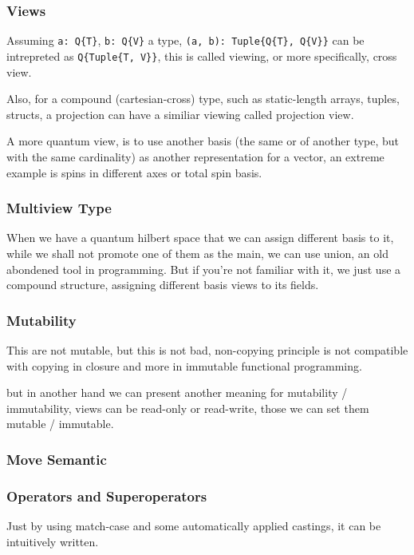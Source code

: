 \documentclass[a4paper,11pt]{article}
\def\co{\lstinline}
\begin{document}
\subsubsection{Views}
Assuming \co|a: Q{T}|, \co|b: Q{V}| a type, \co|(a, b): Tuple{Q{T}, Q{V}}| can be intrepreted as \co|Q{Tuple{T, V}}|, this is called viewing, or more specifically, cross view.

Also, for a compound (cartesian-cross) type, such as static-length arrays, tuples, structs, a projection can have a similiar viewing called projection view.

A more quantum view, is to use another basis (the same or of another type, but with the same cardinality) as another representation for a vector, an extreme example is spins in different axes or total spin basis.

\subsubsection{Multiview Type}

When we have a quantum hilbert space that we can assign different basis to it, while we shall not promote one of them as the main, we can use union, an old abondened tool in programming. But if you're not familiar with it, we just use a compound structure, assigning different basis views to its fields. 

\subsubsection{Mutability}

This are not mutable, but this is not bad, non-copying principle is not compatible with copying in closure and more in immutable functional programming.

but in another hand we can present another meaning for mutability / immutability, 
views can be read-only or read-write, those we can set them mutable / immutable.

\subsubsection{Move Semantic}

\subsubsection{Operators and Superoperators}
Just by using match-case and some automatically applied castings, it can be intuitively written.
\end{document}
